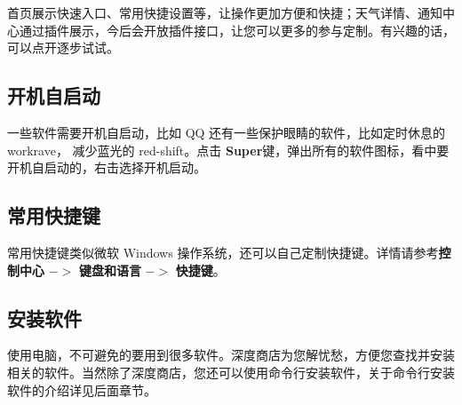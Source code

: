 \documentclass[doctor,openright,twoside]{sjtuthesis}
\theoremstyle{plain}
\theoremstyle{definition}
\theoremstyle{remark}
\theoremstyle{ocrenumbox}
\theoremstyle{plain}
\begin{document}
首页展示快速入口、常用快捷设置等，让操作更加方便和快捷；天气详情、通知中心通过插件展示，今后会开放插件接口，让您可以更多的参与定制。有兴趣的话，可以点开逐步试试。

\subsection{开机自启动}

一些软件需要开机自启动，比如 QQ 还有一些保护眼睛的软件，比如定时休息的
workrave， 减少蓝光的 red-shift。点击
\textbf{Super}键，弹出所有的软件图标，看中要开机自启动的，右击选择开机启动。


\subsection{常用快捷键}

常用快捷键类似微软 Windows
操作系统，还可以自己定制快捷键。详情请参考\textbf{控制中心} \(->\)
\textbf{键盘和语言} \(->\) \textbf{快捷键}。

\subsection{安装软件}

使用电脑，不可避免的要用到很多软件。深度商店为您解忧愁，方便您查找并安装相关的软件。当然除了深度商店，您还可以使用命令行安装软件，关于命令行安装软件的介绍详见后面章节。
\end{document}
